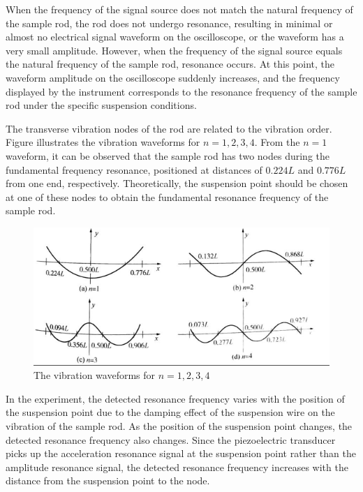 \documentclass[UTF8]{article}
\begin{document}
   When the frequency of the signal source does not match the natural frequency of the sample rod, the rod does not undergo resonance, resulting in minimal or almost no electrical signal waveform on the oscilloscope, or the waveform has a very small amplitude. However, when the frequency of the signal source equals the natural frequency of the sample rod, resonance occurs. At this point, the waveform amplitude on the oscilloscope suddenly increases, and the frequency displayed by the instrument corresponds to the resonance frequency of the sample rod under the specific suspension conditions.
   
   The transverse vibration nodes of the rod are related to the vibration order. Figure illustrates the vibration waveforms for $n = 1, 2, 3, 4$. From the $n=1$ waveform, it can be observed that the sample rod has two nodes during the fundamental frequency resonance, positioned at distances of $0.224L$ and $0.776L$ from one end, respectively. Theoretically, the suspension point should be chosen at one of these nodes to obtain the fundamental resonance frequency of the sample rod.
   
   \begin{figure}[H]
      	    	\centering
      	    	\includegraphics[clip,scale=1.1,trim={0 0 0 0}]{fig/fig6.png}
      	        \caption{The vibration waveforms for $n = 1, 2, 3, 4$}
      	        \label{figure.1}
          \end{figure}
   
   In the experiment, the detected resonance frequency varies with the position of the suspension point due to the damping effect of the suspension wire on the vibration of the sample rod. As the position of the suspension point changes, the detected resonance frequency also changes. Since the piezoelectric transducer picks up the acceleration resonance signal at the suspension point rather than the amplitude resonance signal, the detected resonance frequency increases with the distance from the suspension point to the node.
   
\end{document}
